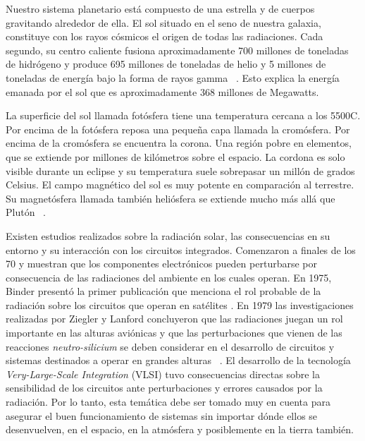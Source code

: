 Nuestro sistema planetario está compuesto de una estrella y de cuerpos gravitando alrededor de ella. El sol situado en el seno de nuestra galaxia, constituye con los rayos cósmicos el origen de todas las radiaciones. Cada segundo, su centro caliente fusiona aproximadamente 700 millones de toneladas de hidrógeno y produce 695 millones de toneladas de helio y 5 millones de toneladas de energía bajo la forma de rayos gamma ~\cite{eddy2009}. Esto explica la energía emanada por el sol que es aproximadamente 368 millones de Megawatts.
   

La superficie del sol llamada fotósfera tiene una temperatura cercana a los 5500\grad C. Por encima de la fotósfera reposa una pequeña capa llamada la cromósfera. Por encima de la cromósfera se encuentra la corona. Una región pobre en elementos, que se extiende por millones de kilómetros sobre el espacio. La cordona es solo   visible durante un eclipse  y su temperatura suele sobrepasar un millón de grados Celsius. El campo magnético del sol es muy potente en comparación al terrestre. Su magnetósfera llamada también heliósfera se extiende mucho más allá que Plutón ~\cite{eddy2009}.

Existen estudios  realizados sobre la radiación solar, las consecuencias en su entorno y su interacción con los circuitos integrados. Comenzaron a finales de los 70 y muestran que los componentes electrónicos pueden perturbarse por consecuencia de las radiaciones del ambiente en los cuales operan. En 1975, Binder presentó la primer publicación que menciona el rol probable de la radiación sobre los circuitos que operan  en satélites \cite{4328188}. En 1979 las investigaciones realizadas  por Ziegler y Lanford concluyeron   que las radiaciones juegan un rol  importante en las alturas aviónicas y que las perturbaciones que vienen de las reacciones \textit{neutro-silicium} se deben considerar en el desarrollo de circuitos y sistemas destinados a operar en grandes alturas ~\cite{ziegler1996}. 
El desarrollo de la tecnología  \textit{Very-Large-Scale Integration} (VLSI) tuvo consecuencias directas sobre la sensibilidad de los circuitos ante perturbaciones y errores causados por la radiación. Por lo tanto, esta temática  debe ser tomado muy en cuenta para asegurar el buen funcionamiento de sistemas sin importar dónde ellos se desenvuelven, en el espacio, en la atmósfera y posiblemente en la tierra también.